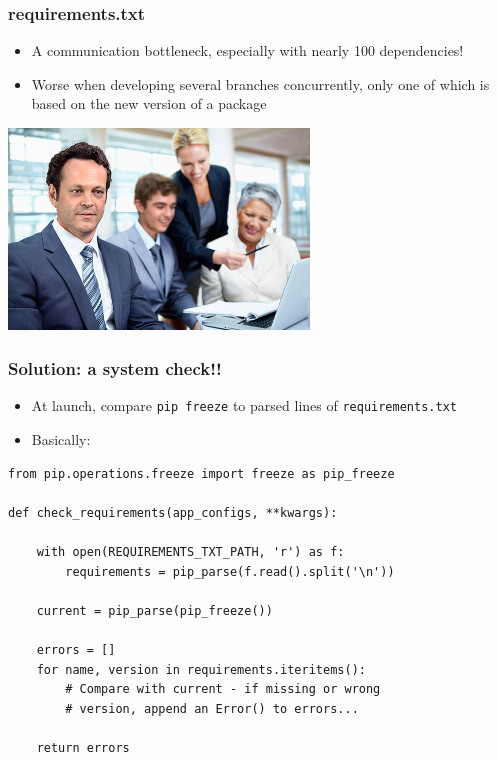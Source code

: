 \documentclass{beamer}
\begin{document}
\begin{frame}[fragile]\frametitle{requirements.txt}

    \begin{itemize}
        \item A communication bottleneck, especially with nearly 100 dependencies!
        \item Worse when developing several branches concurrently, only one of which is based on the new version of a package
    \end{itemize}

    \begin{center}
        \includegraphics[width=8cm]{frozen}
    \end{center}

\end{frame}


\begin{frame}[fragile]\frametitle{Solution: a system check!!}

    \begin{itemize}
        \item At launch, compare \texttt{pip freeze} to parsed lines of \texttt{requirements.txt}
        \item Basically:
    \end{itemize}

    \begin{lstlisting}
from pip.operations.freeze import freeze as pip_freeze

def check_requirements(app_configs, **kwargs):

    with open(REQUIREMENTS_TXT_PATH, 'r') as f:
        requirements = pip_parse(f.read().split('\n'))

    current = pip_parse(pip_freeze())

    errors = []
    for name, version in requirements.iteritems():
        # Compare with current - if missing or wrong
        # version, append an Error() to errors...

    return errors
    \end{lstlisting}

\end{frame}
\end{document}
